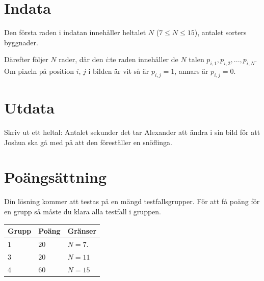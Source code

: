 \section*{Indata}
Den första raden i indatan innehåller heltalet $N$ ($7 \le N \le 15$), antalet sorters byggnader.

Därefter följer $N$ rader, där den $i$:te raden innehåller de $N$ talen $p_{i,1}, p_{i,2}, ..., p_{i,N}$.
Om pixeln på position $i$, $j$ i bilden är vit så är $p_{i,j} = 1$, annars är $p_{i,j} = 0$.

\section*{Utdata}
Skriv ut ett heltal: Antalet sekunder det tar Alexander att ändra i sin bild för att Joshua
ska gå med på att den föreställer en snöflinga.


\section*{Poängsättning}
Din lösning kommer att testas på en mängd testfallsgrupper.
För att få poäng för en grupp så måste du klara alla testfall i gruppen.

\noindent
\begin{tabular}{| l | l | p{12cm} |}
  \hline
  \textbf{Grupp} & \textbf{Poäng} & \textbf{Gränser} \\ \hline
  $1$    & $20$       & $N=7$. \\ \hline
  $3$    & $20$       & $N=11$ \\ \hline
  $4$    & $60$       & $N=15$ \\ \hline
\end{tabular}

